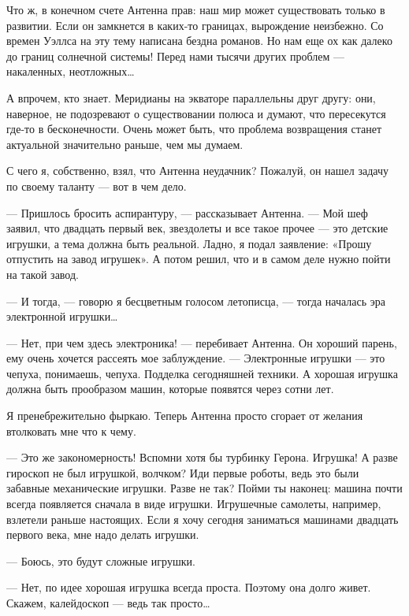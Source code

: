    Что ж, в конечном счете Антенна прав: наш мир может существовать только  в
   развитии. Если он замкнется в каких-то границах, вырождение неизбежно.  Со
   времен Уэллса  на эту  тему написана  бездна романов.  Но нам  еще ох  как
   далеко до границ  солнечной системы!  Перед нами тысячи  других проблем  —
   накаленных, неотложных…

   А впрочем, кто знает. Меридианы  на экваторе параллельны друг другу:  они,
   наверное, не подозревают о существовании полюса и думают, что  пересекутся
   где-то в бесконечности. Очень может быть, что проблема возвращения  станет
   актуальной значительно раньше, чем мы думаем.

   С чего  я, собственно,  взял,  что Антенна  неудачник? Пожалуй,  он  нашел
   задачу по своему таланту — вот в чем дело.

   — Пришлось бросить аспирантуру, — рассказывает Антенна. — Мой шеф  заявил,
   что двадцать  первый век,  звездолеты и  все такое  прочее —  это  детские
   игрушки, а тема  должна быть  реальной. Ладно, я  подал заявление:  «Прошу
   отпустить на завод игрушек». А потом решил, что и в самом деле нужно пойти
   на такой завод.

   — И тогда, — говорю я  бесцветным голосом летописца, — тогда началась  эра
   электронной игрушки…

   — Нет, при чем здесь электроника! — перебивает Антенна. Он хороший парень,
   ему очень хочется рассеять  мое заблуждение. —  Электронные игрушки —  это
   чепуха, понимаешь, чепуха. Подделка сегодняшней техники. А хорошая игрушка
   должна быть прообразом машин, которые появятся через сотни лет.

   Я пренебрежительно  фыркаю.  Теперь  Антенна  просто  сгорает  от  желания
   втолковать мне что к чему.

   — Это же закономерность! Вспомни хотя бы турбинку Герона. Игрушка! А разве
   гироскоп не  был  игрушкой, волчком?  Иди  первые роботы,  ведь  это  были
   забавные механические  игрушки. Разве  не так?  Пойми ты  наконец:  машина
   почти всегда  появляется  сначала  в виде  игрушки.  Игрушечные  самолеты,
   например, взлетели  раньше  настоящих.  Если  я  хочу  сегодня  заниматься
   машинами двадцать первого века, мне надо делать игрушки.

   — Боюсь, это будут сложные игрушки.

   — Нет, по  идее хорошая игрушка  всегда проста. Поэтому  она долго  живет.
   Скажем, калейдоскоп — ведь так просто…

